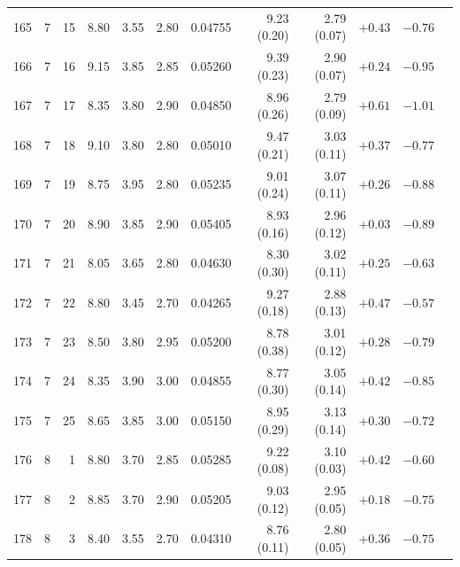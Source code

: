 \begin{longtable}{@{}rrrrrrrrrrrr@{}}
165 & 7 & 15 & \num{8.80} & \num{3.55} & \num{2.80} & \num{0.04755} & \num{9.23} (\num{0.20}) & \num{2.79} (\num{0.07}) & $+\num{0.43}$ & $-\num{0.76}$ &  \\
166 & 7 & 16 & \num{9.15} & \num{3.85} & \num{2.85} & \num{0.05260} & \num{9.39} (\num{0.23}) & \num{2.90} (\num{0.07}) & $+\num{0.24}$ & $-\num{0.95}$ &  \\
167 & 7 & 17 & \num{8.35} & \num{3.80} & \num{2.90} & \num{0.04850} & \num{8.96} (\num{0.26}) & \num{2.79} (\num{0.09}) & $+\num{0.61}$ & $-\num{1.01}$ &  \\
168 & 7 & 18 & \num{9.10} & \num{3.80} & \num{2.80} & \num{0.05010} & \num{9.47} (\num{0.21}) & \num{3.03} (\num{0.11}) & $+\num{0.37}$ & $-\num{0.77}$ &  \\
169 & 7 & 19 & \num{8.75} & \num{3.95} & \num{2.80} & \num{0.05235} & \num{9.01} (\num{0.24}) & \num{3.07} (\num{0.11}) & $+\num{0.26}$ & $-\num{0.88}$ &  \\
170 & 7 & 20 & \num{8.90} & \num{3.85} & \num{2.90} & \num{0.05405} & \num{8.93} (\num{0.16}) & \num{2.96} (\num{0.12}) & $+\num{0.03}$ & $-\num{0.89}$ &  \\
171 & 7 & 21 & \num{8.05} & \num{3.65} & \num{2.80} & \num{0.04630} & \num{8.30} (\num{0.30}) & \num{3.02} (\num{0.11}) & $+\num{0.25}$ & $-\num{0.63}$ &  \\
172 & 7 & 22 & \num{8.80} & \num{3.45} & \num{2.70} & \num{0.04265} & \num{9.27} (\num{0.18}) & \num{2.88} (\num{0.13}) & $+\num{0.47}$ & $-\num{0.57}$ &  \\
173 & 7 & 23 & \num{8.50} & \num{3.80} & \num{2.95} & \num{0.05200} & \num{8.78} (\num{0.38}) & \num{3.01} (\num{0.12}) & $+\num{0.28}$ & $-\num{0.79}$ &  \\
174 & 7 & 24 & \num{8.35} & \num{3.90} & \num{3.00} & \num{0.04855} & \num{8.77} (\num{0.30}) & \num{3.05} (\num{0.14}) & $+\num{0.42}$ & $-\num{0.85}$ &  \\
175 & 7 & 25 & \num{8.65} & \num{3.85} & \num{3.00} & \num{0.05150} & \num{8.95} (\num{0.29}) & \num{3.13} (\num{0.14}) & $+\num{0.30}$ & $-\num{0.72}$ &  \\
176 & 8 & 1 & \num{8.80} & \num{3.70} & \num{2.85} & \num{0.05285} & \num{9.22} (\num{0.08}) & \num{3.10} (\num{0.03}) & $+\num{0.42}$ & $-\num{0.60}$ &  \\
177 & 8 & 2 & \num{8.85} & \num{3.70} & \num{2.90} & \num{0.05205} & \num{9.03} (\num{0.12}) & \num{2.95} (\num{0.05}) & $+\num{0.18}$ & $-\num{0.75}$ &  \\
178 & 8 & 3 & \num{8.40} & \num{3.55} & \num{2.70} & \num{0.04310} & \num{8.76} (\num{0.11}) & \num{2.80} (\num{0.05}) & $+\num{0.36}$ & $-\num{0.75}$ &  \\

\end{longtable}
